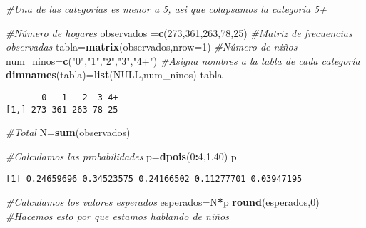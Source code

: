 \documentclass[
  a4paper,
  oneside,
  openany]{book}
\newenvironment{Shaded}{\begin{snugshade}}{\end{snugshade}}
\newcommand{\CommentTok}[1]{\textcolor[rgb]{0.56,0.35,0.01}{\textit{#1}}}
\newcommand{\DataTypeTok}[1]{\textcolor[rgb]{0.13,0.29,0.53}{#1}}
\newcommand{\DecValTok}[1]{\textcolor[rgb]{0.00,0.00,0.81}{#1}}
\newcommand{\FloatTok}[1]{\textcolor[rgb]{0.00,0.00,0.81}{#1}}
\newcommand{\KeywordTok}[1]{\textcolor[rgb]{0.13,0.29,0.53}{\textbf{#1}}}
\newcommand{\NormalTok}[1]{#1}
\newcommand{\OperatorTok}[1]{\textcolor[rgb]{0.81,0.36,0.00}{\textbf{#1}}}
\newcommand{\OtherTok}[1]{\textcolor[rgb]{0.56,0.35,0.01}{#1}}
\newcommand{\StringTok}[1]{\textcolor[rgb]{0.31,0.60,0.02}{#1}}
\begin{document}
\begin{Shaded}
\begin{Highlighting}[]
\CommentTok{\#Una de las categorías es menor a 5, asi que colapsamos la categoría 5+}

\CommentTok{\#Número de hogares}
\NormalTok{observados =}\KeywordTok{c}\NormalTok{(}\DecValTok{273}\NormalTok{,}\DecValTok{361}\NormalTok{,}\DecValTok{263}\NormalTok{,}\DecValTok{78}\NormalTok{,}\DecValTok{25}\NormalTok{)}
\CommentTok{\#Matriz de frecuencias observadas}
\NormalTok{tabla=}\KeywordTok{matrix}\NormalTok{(observados,}\DataTypeTok{nrow=}\DecValTok{1}\NormalTok{)}
\CommentTok{\#Número de niños}
\NormalTok{num\_ninos=}\KeywordTok{c}\NormalTok{(}\StringTok{"0"}\NormalTok{,}\StringTok{"1"}\NormalTok{,}\StringTok{"2"}\NormalTok{,}\StringTok{"3"}\NormalTok{,}\StringTok{"4+"}\NormalTok{)}
\CommentTok{\#Asigna nombres a la tabla de cada categoría}
\KeywordTok{dimnames}\NormalTok{(tabla)=}\KeywordTok{list}\NormalTok{(}\OtherTok{NULL}\NormalTok{,num\_ninos)}
\NormalTok{tabla}
\end{Highlighting}
\end{Shaded}

\begin{verbatim}
       0   1   2  3 4+
[1,] 273 361 263 78 25
\end{verbatim}

\begin{Shaded}
\begin{Highlighting}[]
\CommentTok{\#Total}
\NormalTok{N=}\KeywordTok{sum}\NormalTok{(observados)}

\CommentTok{\#Calculamos las probabilidades}
\NormalTok{p=}\KeywordTok{dpois}\NormalTok{(}\DecValTok{0}\OperatorTok{:}\DecValTok{4}\NormalTok{,}\FloatTok{1.40}\NormalTok{)}
\NormalTok{p}
\end{Highlighting}
\end{Shaded}

\begin{verbatim}
[1] 0.24659696 0.34523575 0.24166502 0.11277701 0.03947195
\end{verbatim}

\begin{Shaded}
\begin{Highlighting}[]
\CommentTok{\#Calculamos los valores esperados}
\NormalTok{esperados=N}\OperatorTok{*}\NormalTok{p}
\KeywordTok{round}\NormalTok{(esperados,}\DecValTok{0}\NormalTok{) }\CommentTok{\#Hacemos esto por que estamos hablando de niños}
\end{Highlighting}
\end{Shaded}
\end{document}
